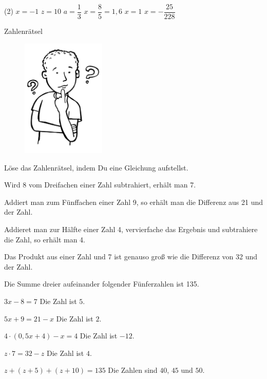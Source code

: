\documentclass[12pt,a5paper,landscape]{scrartcl}
\begin{document}
\begin{loesungskarte}
	\begin{tasks}(2)
		\task $x = -1$
		\task $z = 10$
		\task $a = \dfrac{1}{3}$
		\task $x = \dfrac{8}{5} = 1,6$
		\task $x = 1$
		\task $x = -\dfrac{25}{228}$
	\end{tasks}
\end{loesungskarte}

\begin{karte1}{Zahlenrätsel}
	\begin{figure}
		\includegraphics[width=4cm]{7.4-LT-Abb_Nachdenken}
	\end{figure}
	
	Löse das Zahlenrätsel, indem Du eine Gleichung aufstellst.
	
	\begin{enumeratea}
		\item Wird $8$ vom Dreifachen einer Zahl subtrahiert, erhält man 7.
		\item Addiert man zum Fünffachen einer Zahl 9, so erhält man die Differenz aus 21 und der Zahl.
		\item Addieret man zur Hälfte einer Zahl 4, vervierfache das Ergebnis und subtrahiere die Zahl, so erhält man 4.
		\item Das Produkt aus einer Zahl und 7 ist genauso groß wie die Differenz von 32 und der Zahl.
		\item Die Summe dreier aufeinander folgender Fünferzahlen ist 135.
	\end{enumeratea}
\end{karte1}

\begin{loesungskarte}
	\begin{enumeratea}
		\item $3x - 8 = 7$ \hspace{1cm} Die Zahl ist $5$.
		\item $5x + 9 = 21 - x$ \hspace{1cm} Die Zahl ist $2$.
		\item $4\cdot (0,5x + 4) - x = 4$ \hspace{1cm} Die Zahl ist $-12$.
		\item $z\cdot  7 = 32 - z$  \hspace{1cm} Die Zahl ist $4$.
		\item $z + (z+5) + (z+10) = 135$ \hspace{1cm} Die Zahlen sind $40$, $45$ und $50$.
	\end{enumeratea}
\end{loesungskarte}
\end{document}
